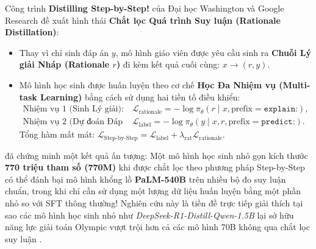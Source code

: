 Công trình \textbf{Distilling Step-by-Step!} của Đại học Washington và Google Research \citep{hsieh2023distilling} đề xuất hình thái \textbf{Chắt lọc Quá trình Suy luận (Rationale Distillation)}:
\begin{itemize}[leftmargin=1.2cm]
    \item Thay vì chỉ sinh đáp án $y$, mô hình giáo viên được yêu cầu sinh ra \textbf{Chuỗi Lý giải Nháp (Rationale $r$)} đi kèm kết quả cuối cùng: $x \to (r, y)$.
    \item Mô hình học sinh được huấn luyện theo cơ chế \textbf{Học Đa Nhiệm vụ (Multi-task Learning)} bằng cách sử dụng hai tiền tố điều khiển:
    \begin{align}
        \text{Nhiệm vụ 1 (Sinh Lý giải):} \quad &\mathcal{L}_{\text{rationale}} = -\log \pi_\theta(r \mid x, \text{prefix}=\texttt{explain:}), \\
        \text{Nhiệm vụ 2 (Dự đoán Đáp án):} \quad &\mathcal{L}_{\text{label}} = -\log \pi_\theta(y \mid x, r, \text{prefix}=\texttt{predict:}).
    \end{align}
    Tổng hàm mất mát: $\mathcal{L}_{\text{Step-by-Step}} = \mathcal{L}_{\text{label}} + \lambda_{\text{rat}} \mathcal{L}_{\text{rationale}}$.
\end{itemize}

\citet{hsieh2023distilling} đã chứng minh một kết quả ấn tượng: Một mô hình học sinh nhỏ gọn kích thước \textbf{770 triệu tham số (770M)} khi được chắt lọc theo phương pháp Step-by-Step có thể đánh bại mô hình khổng lồ \textbf{PaLM-540B} trên nhiều bộ đo suy luận chuẩn, trong khi chỉ cần sử dụng một lượng dữ liệu huấn luyện bằng một phần nhỏ so với SFT thông thường!
Nghiên cứu này là tiền đề trực tiếp giải thích tại sao các mô hình học sinh nhỏ như \textit{DeepSeek-R1-Distill-Qwen-1.5B} lại sở hữu năng lực giải toán Olympic vượt trội hơn cả các mô hình 70B không qua chắt lọc suy luận \citep{deepseek2025r1}.
